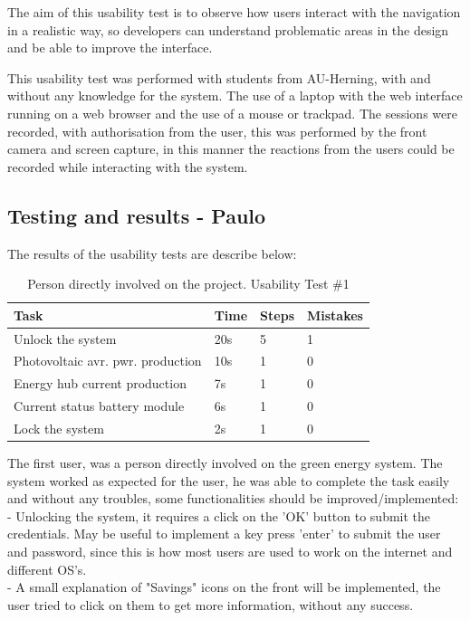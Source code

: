 The aim of this usability test is to observe how users interact with the navigation in a realistic way, so developers can understand problematic areas in the design and be able to improve the interface.

This usability test was performed with students from AU-Herning, with and without any knowledge for the system. The use of a laptop with the web interface running on a web browser and the use of a mouse or trackpad. The sessions were recorded, with authorisation from the user, this was performed by the front camera and screen capture, in this manner the reactions from the users could be recorded while interacting with the system.

\subsection{Testing and results - Paulo}

The results of the usability tests are describe below:

\begin{table}[H]
	\begin{tabular}{ | l | l | l | l |}
		\hline
		Task 				 	     & 		Time 	& 	Steps 	& 	Mistakes 		\\ \hline
		Unlock the system    			     & 		20s  		& 	 5 		& 	1 			\\ \hline
		Photovoltaic avr. pwr. production  & 		10s 		& 	 1 		& 	0 			\\ \hline
		Energy hub current production 	     & 		7s 		& 	 1 		& 	0			 \\ \hline
		Current status battery module 	     & 		6s 		& 	 1 		& 	0 			 \\ \hline
		Lock the system 			     & 		2s 		& 	 1 		& 	0 			 \\ \hline
	\end{tabular}
    \caption{Person directly involved on the project. Usability Test \#1}
\end{table}
The first user, was a person directly involved on the green energy system. The system worked as expected for the user, he was able to complete the task easily and without any troubles, some functionalities should be improved/implemented:\\
- Unlocking the system, it requires a click on the 'OK' button to submit the credentials. May be useful to implement a key press 'enter' to submit the user and password, since this is how most users are used to work on the internet and different OS's.\\
- A small explanation of "Savings" icons on the front will be implemented, the user tried to click on them to get more information, without any success.\\

